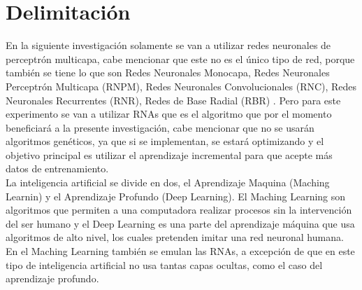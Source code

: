 \section{Delimitación}
\label{sec:delimitation}
	
	
    En la siguiente investigación solamente se van a utilizar redes neuronales de perceptr\'on multicapa, 
    cabe mencionar que este no es el único tipo de red, porque también se tiene lo que son Redes Neuronales Monocapa,
    Redes Neuronales Perceptrón Multicapa (RNPM), Redes Neuronales Convolucionales (RNC), Redes Neuronales Recurrentes (RNR),
    Redes de Base Radial (RBR) \cite{royo2021}. Pero para este experimento se van a utilizar RNAs que es el algoritmo que 
    por el momento beneficiar\'a a la presente investigación, cabe mencionar que no se usar\'an algoritmos genéticos, 
    ya que si se implementan, se estará optimizando y el objetivo principal es utilizar el aprendizaje incremental 
    para que acepte más datos de entrenamiento.\\
    
    La inteligencia artificial se divide en dos, el Aprendizaje Maquina (Maching Learnin) y el Aprendizaje 
    Profundo (Deep Learning). El Maching Learning son algoritmos que permiten a una computadora realizar 
    procesos sin la intervención del ser humano y el Deep Learning es una parte del aprendizaje m\'aquina
    que usa algoritmos de alto nivel, los cuales pretenden imitar una red neuronal humana. En el Maching Learning
    tambi\'en se emulan las RNAs, a excepci\'on de que en este tipo de inteligencia artificial no usa tantas
    capas ocultas, como el caso del aprendizaje profundo.
